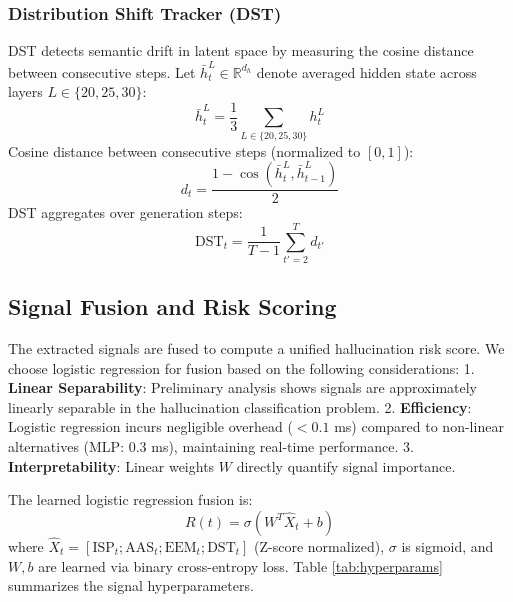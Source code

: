 \documentclass[conference]{IEEEtran}
\begin{document}
\subsubsection{Distribution Shift Tracker (DST)}
DST detects semantic drift in latent space by measuring the cosine distance between consecutive steps. Let $\bar{h}^L_t \in \mathbb{R}^{d_h}$ denote averaged hidden state across layers $L \in \{20, 25, 30\}$:
\begin{equation}
\bar{h}^L_t = \frac{1}{3} \sum_{L \in \{20,25,30\}} h^L_t
\label{eq:h_avg}
\end{equation}
Cosine distance between consecutive steps (normalized to $[0,1]$):
\begin{equation}
d_t = \frac{1 - \cos(\bar{h}^L_t, \bar{h}^L_{t-1})}{2}
\label{eq:cosine_dist}
\end{equation}
DST aggregates over generation steps:
\begin{equation}
\text{DST}_t = \frac{1}{T-1} \sum_{t'=2}^{T} d_{t'}
\label{eq:dst}
\end{equation}

\subsection{Signal Fusion and Risk Scoring}
The extracted signals are fused to compute a unified hallucination risk score. We choose logistic regression for fusion based on the following considerations:
1. \textbf{Linear Separability}: Preliminary analysis shows signals are approximately linearly separable in the hallucination classification problem.
2. \textbf{Efficiency}: Logistic regression incurs negligible overhead ($<0.1$ ms) compared to non-linear alternatives (MLP: 0.3 ms), maintaining real-time performance.
3. \textbf{Interpretability}: Linear weights $W$ directly quantify signal importance.

The learned logistic regression fusion is:
\begin{equation}
R(t) = \sigma(W^T \hat{X}_t + b)
\label{eq:fusion}
\end{equation}
where $\hat{X}_t = [\text{ISP}_t; \text{AAS}_t; \text{EEM}_t; \text{DST}_t]$ (Z-score normalized), $\sigma$ is sigmoid, and $W, b$ are learned via binary cross-entropy loss. Table \ref{tab:hyperparams} summarizes the signal hyperparameters.
\end{document}
